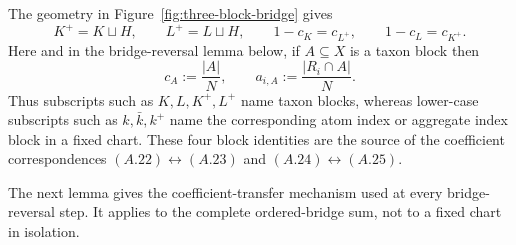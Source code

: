 \documentclass[11pt]{article}
\begin{document}
\noindent
The geometry in Figure~\ref{fig:three-block-bridge} gives
\[
K^+=K\sqcup H,
\qquad
L^+=L\sqcup H,
\qquad
1-c_K=c_{L^+},
\qquad
1-c_L=c_{K^+}.
\]
Here and in the bridge-reversal lemma below, if $A\subseteq X$ is a taxon
block then
\[
c_A:=\frac{|A|}{N},\qquad
a_{i,A}:=\frac{|R_i\cap A|}{N}.
\]
Thus subscripts such as $K,L,K^+,L^+$ name taxon blocks, whereas lower-case
subscripts such as $k,\bar k,k^+$ name the corresponding atom index or
aggregate index block in a fixed chart.
These four block identities are the source of the coefficient correspondences
$(A.22)\leftrightarrow(A.23)$ and
$(A.24)\leftrightarrow(A.25)$.


The next lemma gives the coefficient-transfer mechanism used at every
bridge-reversal step.  It applies to the complete ordered-bridge sum, not to
a fixed chart in isolation.
\end{document}

